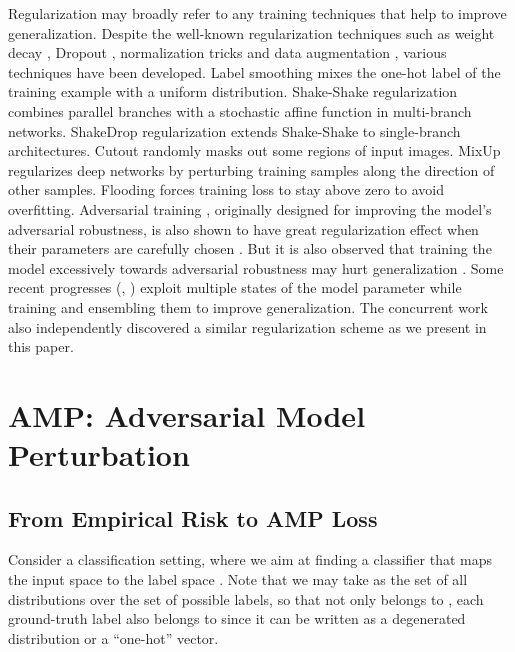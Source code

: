 \documentclass[final]{cvpr}
\begin{document}
Regularization may broadly refer to any training techniques that help to improve generalization. Despite the well-known regularization techniques such as weight decay \cite{krogh1992simple}, Dropout \cite{srivastava2014dropout}, normalization tricks \cite{ba2016layer,ioffe2015batch} and data augmentation \cite{cubuk2019autoaugment,krizhevsky2012imagenet,lim2019fast}, various techniques have been developed. Label smoothing \cite{szegedy2016rethinking} mixes the one-hot label of the training example with a uniform distribution. Shake-Shake regularization \cite{gastaldi2017shake} combines parallel branches with a stochastic affine function in multi-branch networks. ShakeDrop regularization \cite{yamada2019shakedrop} extends Shake-Shake to single-branch architectures. Cutout \cite{devries2017improved} randomly masks out some regions of input images. MixUp \cite{zhang2018mixup} regularizes deep networks by perturbing training samples along the direction of other samples. Flooding \cite{ishida2020we} forces training loss to stay above zero to avoid overfitting. Adversarial training \cite{goodfellow2015explaining}, originally designed for improving the model's adversarial robustness, is also shown to have great regularization effect when their parameters are carefully chosen \cite{miyato2016adversarial}. But it is also observed that training the model excessively towards adversarial robustness may hurt generalization \cite{tsipras2018robustness}. Some recent progresses (\eg, \cite{garipov2018ensembling,izmailov2018averaging}) exploit multiple states of the model parameter while training and ensembling them to improve generalization. The concurrent work \cite{foret2021sharpness} also independently discovered a similar regularization scheme as we present in this paper. 

\section{AMP: Adversarial Model Perturbation}

\subsection{From Empirical Risk to AMP Loss}

Consider a classification setting, where we aim at finding a classifier  that maps the input space  to the label space . Note that we may take  as the set of all distributions over the set of possible labels, so that not only  belongs to , each ground-truth label also belongs to  since it can be written as a degenerated distribution or a ``one-hot'' vector.
\end{document}
